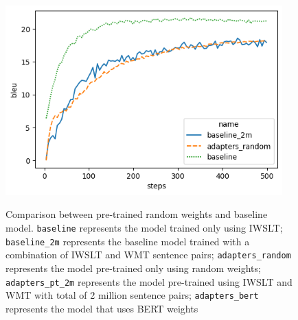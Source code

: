 \begin{figure}[h]
    {\includegraphics[width=0.95\textwidth]{img/random.png}}
    \centering
    \caption{Comparison between pre-trained random weights and baseline model. \texttt{baseline} represents the model trained only using IWSLT; \texttt{baseline\_2m} represents the baseline model trained with a combination of IWSLT and WMT sentence pairs; \texttt{adapters\_random} represents the model pre-trained only using random weights; \texttt{adapters\_pt\_2m} represents the model pre-trained using IWSLT and WMT with total of 2 million sentence pairs; \texttt{adapters\_bert} represents the model that uses BERT weights}
    \label{img:rndbslcmp}
\end{figure}

